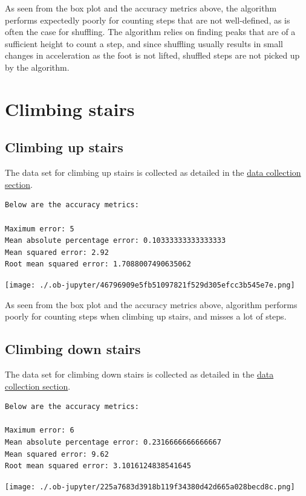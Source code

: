 \documentclass[12pt]{report}
\begin{document}
\clearpage

As seen from the box plot and the accuracy metrics above,
the algorithm performs expectedly poorly for counting steps that are
not well-defined, as is often the case for shuffling.
The algorithm relies on finding peaks that are of a sufficient height
to count a step, and since shuffling usually results in
small changes in acceleration as the foot is not lifted,
shuffled steps are not picked up by the algorithm.
\section{Climbing stairs}
\label{sec:org9190638}

\subsection{Climbing up stairs}
\label{sec:org604e945}
The data set for climbing up stairs is collected as detailed in the
\hyperref[orgdcbbb87]{data collection section}.
\label{org55268b9}
\begin{verbatim}
Below are the accuracy metrics:

Maximum error: 5
Mean absolute percentage error: 0.10333333333333333
Mean squared error: 2.92
Root mean squared error: 1.7088007490635062
\end{verbatim}

\begin{center}
\texttt{[image: ./.ob-jupyter/46796909e5fb51097821f529d305efcc3b545e7e.png]}
\end{center}

As seen from the box plot and the accuracy metrics above,
algorithm performs poorly for counting steps when climbing up stairs,
and misses a lot of steps.
\subsection{Climbing down stairs}
\label{sec:orgac4700a}
The data set for climbing down stairs is collected as detailed in the
\hyperref[orgdcbbb87]{data collection section}.
\label{orgea19e25}
\begin{verbatim}
Below are the accuracy metrics:

Maximum error: 6
Mean absolute percentage error: 0.2316666666666667
Mean squared error: 9.62
Root mean squared error: 3.1016124838541645
\end{verbatim}

\begin{center}
\texttt{[image: ./.ob-jupyter/225a7683d3918b119f34380d42d665a028becd8c.png]}
\end{center}
\end{document}
